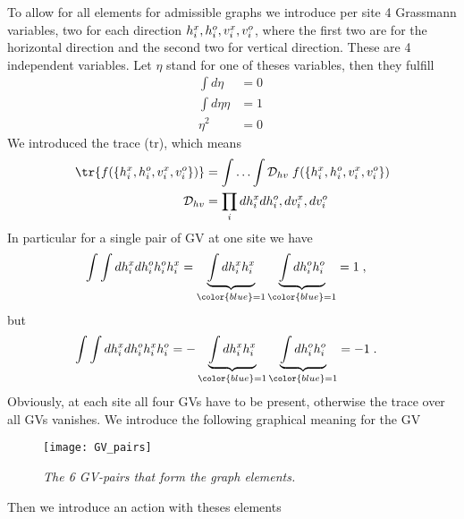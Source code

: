 To allow for all elements for admissible graphs we introduce per site 4 
Grassmann variables, two for each direction
$h^{x}_{i},h^{o}_{i},v^{x}_{i},v^{o}_{i}$, where the first two are for the horizontal direction
and the second two for vertical direction. These are 4 independent variables. Let $\eta $ stand for one of theses variables, then they fulfill
%
\begin{align*}
\int d \eta  &= 0\; \\
\int d \eta  \eta &= 1\\
\eta^{2} &= 0
\end{align*}
%
%
We introduced the trace ($\text{tr}$), which means
%
\begin{subequations}\label{eq:Disingi}
\begin{align}
\tr {f(\{\hdag{i},\hnag{i},\vdag{i},\vnag{i}\})} &= \Int \Disingi\;f(\{\hdag{i},\hnag{i},\vdag{i},\vnag{i}\})\\
\Disingi &= \prod_{i}   d\hdag{i} d \hnag{i}, d\vdag{i},d \vnag{i}
\end{align}
\end{subequations}
%
In particular for a single pair of GV at one site we have
%
\begin{align}
\int\int d \hdag{i} d \hnag{i}  \hnag{i} \hdag{i} &=
\underbrace{
\int d \hdag{i} \hdag{i}
}_{\color{blue} = 1} \underbrace{
\int d \hnag{i}  \hnag{i} 
}_{\color{blue} = 1} = 1\;,
\end{align}
%
but
%
\begin{align}
\int\int d \hdag{i} d \hnag{i}   \hdag{i} \hnag{i}&= -
\underbrace{
\int d \hdag{i} \hdag{i}
}_{\color{blue} = 1} \underbrace{
\int d \hnag{i}  \hnag{i} 
}_{\color{blue} = 1} = -1\;.
\end{align}
%
Obviously, at each site all four GVs have to be present, otherwise the trace over all GVs vanishes.
\clearpage 
We introduce the following graphical meaning for the GV
\begin{figure}[h]
\begin{center}
\texttt{[image: GV\_pairs]}
\caption{{\it The 6 GV-pairs that form the graph elements.}\label{fig:GV_pairs}}
\end{center}
\end{figure}
%

Then we introduce an  action with theses elements
%

